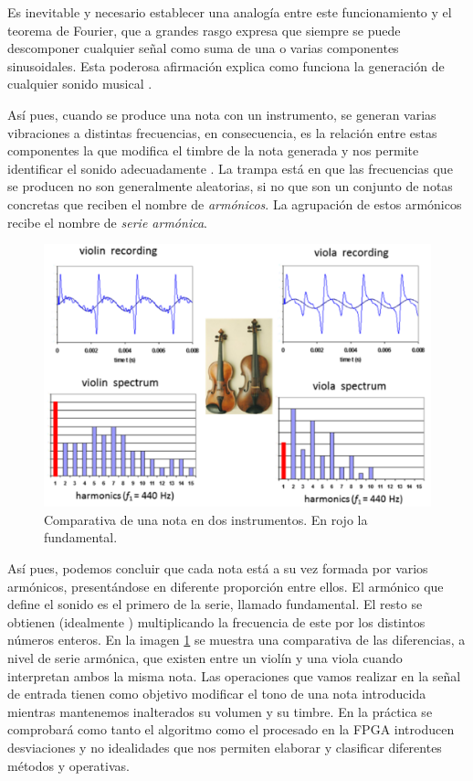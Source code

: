 Es inevitable y necesario establecer una analogía entre este funcionamiento y el teorema de Fourier, que a grandes rasgo expresa que siempre se puede descomponer cualquier señal como suma de una o varias componentes sinusoidales. Esta poderosa afirmación explica como funciona la generación de cualquier sonido musical .

Así pues, cuando se produce una nota con un instrumento, se generan varias vibraciones a distintas frecuencias, en consecuencia, es la relación entre estas componentes la que modifica el timbre de la nota generada y nos permite identificar el sonido adecuadamente \cite{arm_str}. La trampa está en que las frecuencias que se producen no son generalmente aleatorias, si no que son un conjunto de notas concretas que reciben el nombre de \emph{armónicos}. La agrupación de estos armónicos recibe el nombre de \emph{serie armónica}.

\begin{figure}[!b]
\begin{center}
\includegraphics[width=14cm]{img/armonicos.png}
\caption{\label{fig:armonicos}Comparativa de una nota en dos instrumentos. En rojo la fundamental.}
\end{center}
\end{figure}

Así pues, podemos concluir que cada nota está a su vez formada por varios armónicos, presentándose en diferente proporción entre ellos. El armónico que define el sonido es el primero de la serie, llamado fundamental. El resto se obtienen (idealmente \cite{arm_wood2}) multiplicando la frecuencia de este por los distintos números enteros. En la imagen \ref{fig:armonicos} se muestra una comparativa de las diferencias, a nivel de serie armónica, que existen entre un violín y una viola cuando interpretan ambos la misma nota. Las operaciones que vamos realizar en la señal de entrada tienen como objetivo modificar el tono de una nota introducida mientras mantenemos inalterados su volumen y su timbre. En la práctica se comprobará como tanto el algoritmo como el procesado en la FPGA introducen desviaciones y no idealidades que nos permiten elaborar y clasificar diferentes métodos y operativas.

